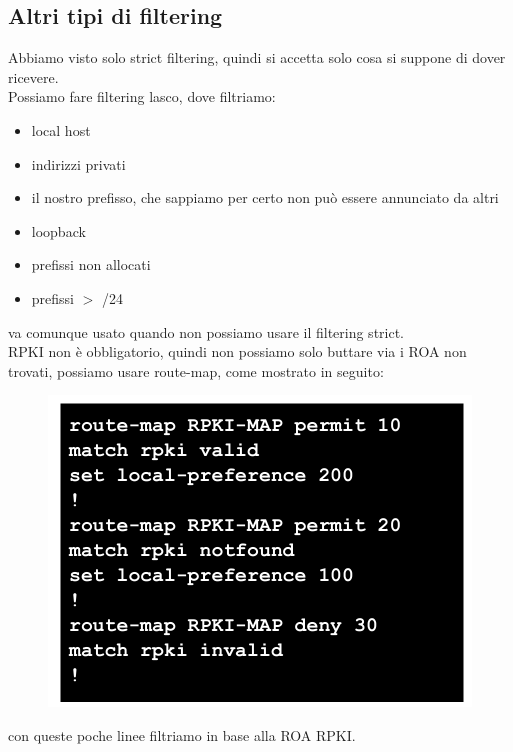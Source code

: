\documentclass[12pt, oneside]{extbook} %
\begin{document}
\subsection{Altri tipi di filtering}
Abbiamo visto solo strict filtering, quindi si accetta solo cosa si suppone di dover ricevere.
\\Possiamo fare filtering lasco, dove filtriamo:
\begin{itemize}
	\item local host
	\item indirizzi privati
	\item il nostro prefisso, che sappiamo per certo non può essere annunciato da altri
	\item loopback
	\item prefissi non allocati
	\item prefissi $>$ /24
\end{itemize}
va comunque usato quando non possiamo usare il filtering strict.
\\RPKI non è obbligatorio, quindi non possiamo solo buttare via i ROA non trovati, possiamo usare route-map, come mostrato in seguito:\\
\begin{figure}[h!]
    \centering
    \includegraphics[scale=0.5]{../../immagini/route_map}
\end{figure}
con queste poche linee filtriamo in base alla ROA RPKI.
\end{document}
